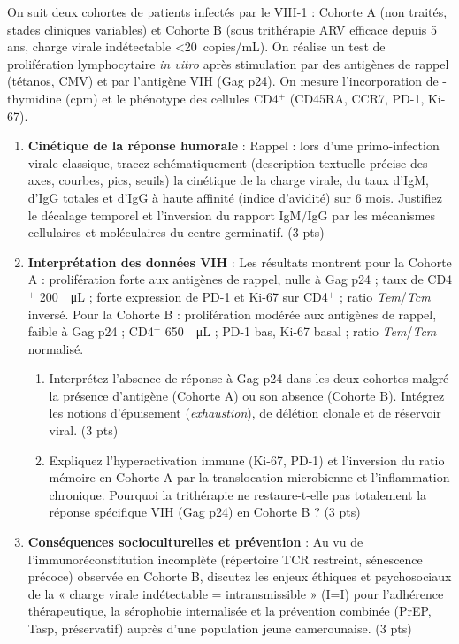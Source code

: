 \documentclass[11pt]{article}
\begin{document}
\begin{exercice}
On suit deux cohortes de patients infectés par le VIH-1 : Cohorte A (non traités, stades cliniques variables) et Cohorte B (sous trithérapie ARV efficace depuis 5 ans, charge virale indétectable \textless \SI{20}{copies/mL}). On réalise un test de prolifération lymphocytaire \textit{in vitro} après stimulation par des antigènes de rappel (tétanos, CMV) et par l'antigène VIH (Gag p24). On mesure l'incorporation de -thymidine (cpm) et le phénotype des cellules CD4$^+$ (CD45RA, CCR7, PD-1, Ki-67).

\begin{enumerate}
    \item \textbf{Cinétique de la réponse humorale} : Rappel : lors d'une primo-infection virale classique, tracez schématiquement (description textuelle précise des axes, courbes, pics, seuils) la cinétique de la charge virale, du taux d'IgM, d'IgG totales et d'IgG à haute affinité (indice d'avidité) sur 6 mois. Justifiez le décalage temporel et l'inversion du rapport IgM/IgG par les mécanismes cellulaires et moléculaires du centre germinatif. (3 pts)
    \item \textbf{Interprétation des données VIH} : Les résultats montrent pour la Cohorte A : prolifération forte aux antigènes de rappel, nulle à Gag p24 ; taux de CD4$^+$ \SI{200}{\per\micro\liter} ; forte expression de PD-1 et Ki-67 sur CD4$^+$ ; ratio \textit{Tem}/\textit{Tcm} inversé. Pour la Cohorte B : prolifération modérée aux antigènes de rappel, faible à Gag p24 ; CD4$^+$ \SI{650}{\per\micro\liter} ; PD-1 bas, Ki-67 basal ; ratio \textit{Tem}/\textit{Tcm} normalisé.
    \begin{enumerate}
        \item Interprétez l'absence de réponse à Gag p24 dans les deux cohortes malgré la présence d'antigène (Cohorte A) ou son absence (Cohorte B). Intégrez les notions d'épuisement (\textit{exhaustion}), de délétion clonale et de réservoir viral. (3 pts)
        \item Expliquez l'hyperactivation immune (Ki-67, PD-1) et l'inversion du ratio mémoire en Cohorte A par la translocation microbienne et l'inflammation chronique. Pourquoi la trithérapie ne restaure-t-elle pas totalement la réponse spécifique VIH (Gag p24) en Cohorte B ? (3 pts)
    \end{enumerate}
    \item \textbf{Conséquences socioculturelles et prévention} : Au vu de l'immunoréconstitution incomplète (répertoire TCR restreint, sénescence précoce) observée en Cohorte B, discutez les enjeux éthiques et psychosociaux de la « charge virale indétectable = intransmissible » (I=I) pour l'adhérence thérapeutique, la sérophobie internalisée et la prévention combinée (PrEP, Tasp, préservatif) auprès d'une population jeune camerounaise. (3 pts)
\end{enumerate}
\end{exercice}
\end{document}
